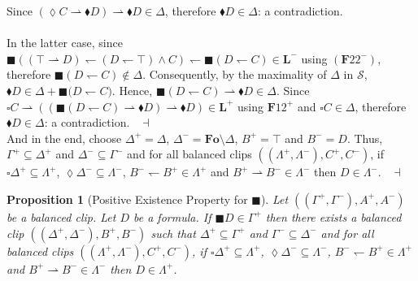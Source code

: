 \documentclass[draft]{article}
\newtheorem{proposition}{Proposition}
\newenvironment{proof}{{\bf Proof:}}{~$\dashv$\\}
\def\Formula{\mathbf{A}}
\def\Formula{\mathbf{F}}
\def\Fo{\mathbf{Fo}}
\def\L{\mathbf{L}}
\begin{document}
\begin{proof}
\begin{proof}
Since $({\lozenge}C{\rightharpoonup}{\blacklozenge}D){\rightharpoonup}{\blacklozenge}D{\in}\Delta$, therefore ${\blacklozenge}D{\in}\Delta$: a contradiction.
%
%
\\
\\
%
%
In the latter case, since ${\blacksquare}(({\top}{\rightharpoonup}D){\leftharpoondown}(D{\leftharpoondown}{\top}){\wedge}C){\leftharpoondown}{\blacksquare}(D{\leftharpoondown}C){\in}\L^{-}$ using $(\Formula22^{-})$, therefore ${\blacksquare}(D{\leftharpoondown}C){\not\in}\Delta$.
Consequently, by the maximality of $\Delta$ in ${\mathcal S}$, ${\blacklozenge}D{\in}\Delta{+}{\blacksquare}(D{\leftharpoondown}
%
%
%
%
%
%
%
$\linebreak$
%
%
%
%
%
%
C)$.
Hence, ${\blacksquare}(D{\leftharpoondown}C){\rightharpoonup}{\blacklozenge}D{\in}\Delta$.
Since ${\square}C{\rightharpoonup}(({\blacksquare}(D{\leftharpoondown}C){\rightharpoonup}{\blacklozenge}D){\rightharpoonup}{\blacklozenge}D){\in}\L^{+}$ using $\Formula12^{+}$ and ${\square}C{\in}\Delta$, therefore ${\blacklozenge}D{\in}\Delta$: a contradiction.
%
%
\medskip
%
%
\end{proof}
%
%
And in the end, choose $\Delta^{+}{=}\Delta$, $\Delta^{-}{=}\Fo{\setminus}\Delta$, $B^{+}{=}{\top}$ and $B^{-}{=}D$.
Thus, $\Gamma^{+}{\subseteq}\Delta^{+}$ and $\Delta^{-}{\subseteq}\Gamma^{-}$ and for all balanced clips $((\Lambda^{+},\Lambda^{-}),C^{+},C^{-})$, if ${\square}\Delta^{+}{\subseteq}\Lambda^{+}$, ${\lozenge}\Delta^{-}{\subseteq}\Lambda^{-}$, $B^{-}{\leftharpoondown}B^{+}{\in}\Lambda^{+}$ and $B^{+}{\rightharpoonup}B^{-}{\in}\Lambda^{-}$ then $D{\in}\Lambda^{-}$.
%
%
\medskip
%
%
\end{proof}
%
%
\begin{proposition}[Positive Existence Property for $\blacksquare$]\label{Proposition:let:be:a:balanced:clip:let:be:a:formula:if:then:there:exists:a:balanced:clip:such:that:and:and:for:all:balanced:clips:if:and:then:2}
%
%
Let $((\Gamma^{+},\Gamma^{-}),A^{+},A^{-})$ be a
%
%
%
%
%
%
%
\linebreak
%
%
%
%
%
%
balanced clip.
Let $D$ be a formula.
If ${\blacksquare}D{\in}\Gamma^{+}$ then there exists a balanced clip $((\Delta^{+},\Delta^{-}),B^{+},B^{-})$ such that $\Delta^{+}{\subseteq}\Gamma^{+}$ and $\Gamma^{-}{\subseteq}\Delta^{-}$ and for all balanced clips $((\Lambda^{+},\Lambda^{-}),C^{+},C^{-})$, if ${\square}\Delta^{+}{\subseteq}\Lambda^{+}$, ${\lozenge}\Delta^{-}{\subseteq}\Lambda^{-}$, $B^{-}{\leftharpoondown}B^{+}{\in}\Lambda^{+}$ and $B^{+}{\rightharpoonup}B^{-}{\in}\Lambda^{-}$ then $D{\in}\Lambda^{+}$.
%
%
\end{proposition}
\end{document}
